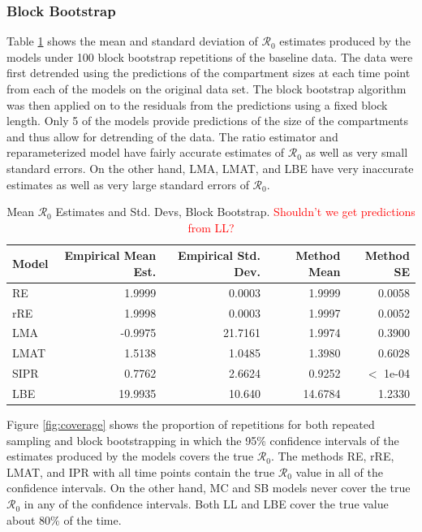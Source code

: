 \documentclass[12pt]{article}
\newcommand{\com}[1]{\textcolor{red}{ #1}}
\newcommand{\rr}{\ensuremath{\mathcal{R}_0}}
\begin{document}
\subsubsection{Block Bootstrap}

Table \ref{tab:bb-samp} shows the mean and standard deviation of $\rr$ estimates produced by the models under 100 block bootstrap repetitions of the baseline data. The data were first detrended using the predictions of the compartment sizes at each time point from each of the models on the original data set. The block bootstrap algorithm was then applied on to the residuals from the predictions using a fixed block length. Only 5 of the models provide predictions of the size of the compartments and thus allow for detrending of the data. The ratio estimator and reparameterized model have fairly accurate estimates of $\rr$ as well as very small standard errors. On the other hand, LMA, LMAT, and LBE  have very inaccurate estimates as well as very large standard errors of $\rr$.

\begin{table}[H]
	
	\centering
	\begin{tabular}[t]{l|r|r|r|r}
          \hline
          	Model & Empirical Mean Est. & Empirical Std. Dev. & Method Mean & Method SE\\
		\hline
		RE & 1.9999 & 0.0003 & 1.9999 & 0.0058\\
		\hline
		rRE & 1.9998 & 0.0003 & 1.9997 & 0.0052\\
		\hline
		LMA & -0.9975 & 21.7161 & 1.9974 & 0.3900\\
		\hline
		LMAT & 1.5138 & 1.0485 & 1.3980 & 0.6028 \\
		\hline
		SIPR & 0.7762 & 2.6624 & 0.9252 & $<$ 1e-04 \\
		\hline
		LBE & 19.9935 & 10.640 & 14.6784 & 1.2330 \\
		\hline
	\end{tabular}
	\caption{Mean $\rr$ Estimates and Std. Devs, Block Bootstrap.  \com{Shouldn't we get predictions from LL?}}
	\label{tab:bb-samp}
\end{table}

Figure \ref{fig:coverage} shows the proportion of repetitions for both repeated sampling and block bootstrapping in which the 95\% confidence intervals of the estimates produced by the models covers the true $\rr$. The methods RE, rRE, LMAT, and IPR with all time points contain the true $\rr$ value in all of the confidence intervals. On the other hand, MC and SB models never cover the true $\rr$ in any of the confidence intervals.  Both LL and LBE cover the true value about 80\% of the time.
\end{document}
